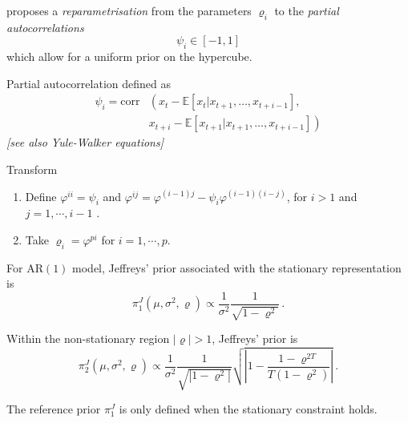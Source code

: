 \begin{slide}[label=DLrepa]
{} proposes a {\em reparametrisation}  
from the parameters $\varrho_i$ to the {\em partial autocorrelations}
$$
  \psi_i \in [-1,1]
$$
which allow for a uniform prior on the hypercube.

\pause
Partial autocorrelation defined as
\begin{align*}
\psi_i = \text{corr}&\left(x_t-\mathbb{E}[x_t|x_{t+1},\ldots,x_{t+i-1}],\right.\\
&\left.x_{t+i}-\mathbb{E}[x_{t+1}|x_{t+1},\ldots,x_{t+i-1}] \right)
\end{align*}
{\em [see also Yule-Walker equations]}

\end{slide}\begin{slide}

\begin{block}{Transform}
{\sffamily
\begin{enumerate}
\item {\sf Define  $\varphi^{ii} = \psi_i$  and
$\varphi^{ij} = \varphi^{(i-1)j} - \psi_i \varphi^{(i-1)(i-j)}$,
for $i > 1$  and  $j=1,\cdots,i-1$ .}

\item {\sf Take $\varrho_i = \varphi^{pi}$ for $i=1,\cdots,p$.}
\end{enumerate}}
\end{block}

\end{slide}\begin{slide}

For AR$(1)$ model, Jeffreys' prior associated with the stationary representation is 
$$
\pi_1^J(\mu,\sigma^2,\varrho) \propto \frac{1}{\sigma^2} \frac{1}{\sqrt{1-\varrho^2}} \,.
$$

Within the non-stationary region $|\varrho| > 1$, Jeffreys' prior is 
$$
\pi_2^J(\mu,\sigma^2,\varrho) \propto \frac{1}{\sigma^2} 
\frac{1}{\sqrt{|1-\varrho^2|}}
\sqrt{ \left| 1 - \frac{1-\varrho^{2T}}{T(1-\varrho^2)} \right| }\,.
$$

\centerline{}

\end{slide}\begin{slide}

The reference prior $\pi_1^J$ is only defined when the stationary constraint holds. 


\end{slide}
